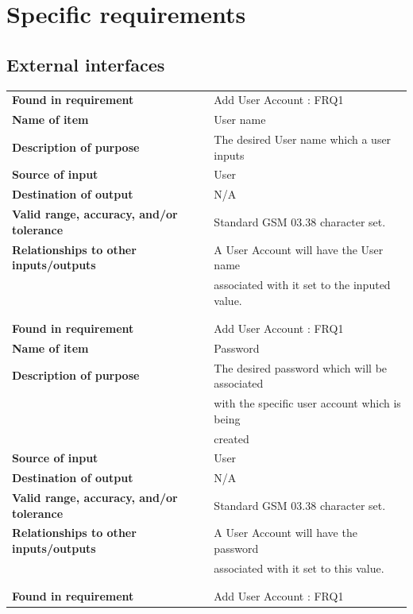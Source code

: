 \section{Specific requirements}

\subsection{External interfaces}
\begin{tabular}{ll}
\textbf{Found in requirement}&Add User Account : FRQ1\\
\textbf{Name of item}&User name\\
\textbf{Description of purpose}&The desired User name which a user inputs\\
\textbf{Source of input}&User\\
\textbf{Destination of output}&N/A\\
\textbf{Valid range, accuracy, and/or tolerance}&Standard GSM 03.38 character set.\\
\textbf{Relationships to other inputs/outputs}&A User Account will have the User name \\&associated with it set to the inputed value.\\
&\\
&\\
\textbf{Found in requirement}&Add User Account : FRQ1\\
\textbf{Name of item}&Password\\
\textbf{Description of purpose}&The desired password which will be associated\\& with the specific user account which is being\\& created\\
\textbf{Source of input}&User\\
\textbf{Destination of output}&N/A\\
\textbf{Valid range, accuracy, and/or tolerance}&Standard GSM 03.38 character set.\\
\textbf{Relationships to other inputs/outputs}&A User Account will have the password\\& associated with it set to this value.\\
&\\
&\\
\textbf{Found in requirement}&Add User Account : FRQ1\\

\end{tabular}
